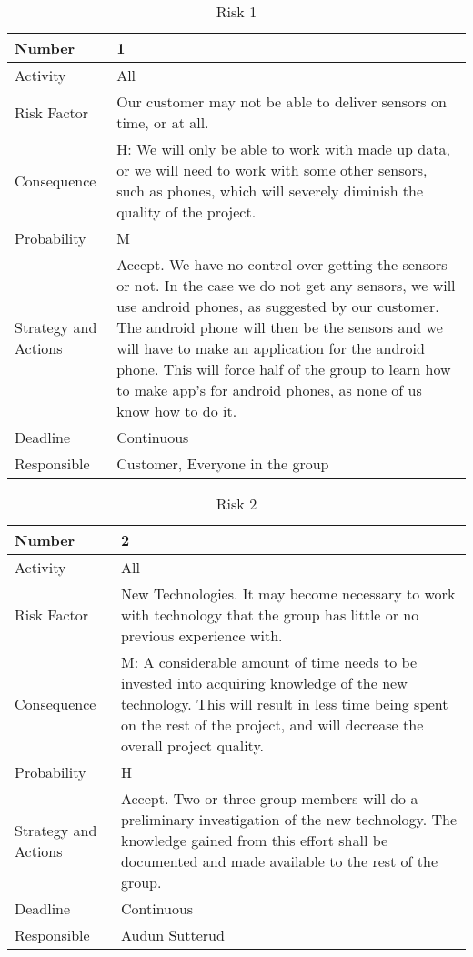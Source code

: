 \documentclass[../document.tex]{subfiles}
\begin{document}
\begin{table}[H]
\caption{Risk 1}
\begin{tabularx}{\textwidth}{|l|X|}
\hline
Number
&1
\\ \hline Activity
&All
\\ \hline Risk Factor
&Our customer may not be able to deliver sensors on time, or at all.
\\ \hline Consequence
&H: We will only be able to work with made up data, or we will need to work with some other sensors, such as phones, which will severely diminish the quality of the project.
\\ \hline Probability
&M
\\ \hline Strategy and Actions
&Accept. We have no control over getting the sensors or not. In the case we do not get any sensors, we will use android phones, as suggested by our customer. The android phone will then be the sensors and we will have to make an application for the android phone. This will force half of the group to learn how to make app’s for android phones, as none of us know how to do it.
\\ \hline Deadline
&Continuous
\\ \hline Responsible
&Customer, Everyone in the group
\\ \hline 
\end{tabularx}
\end{table}

\begin{table}[H]
\caption{Risk 2}
\begin{tabularx}{\textwidth}{|l|X|}
\hline
Number
&2
\\ \hline Activity
&All
\\ \hline Risk Factor
&New Technologies. It may become necessary to work with technology that the group has little or no previous experience with.
\\ \hline Consequence
&M: A considerable amount of time needs to be invested into acquiring knowledge of the new technology. This will result in less time being spent on the rest of the project, and will decrease the overall project quality.
\\ \hline Probability
&H
\\ \hline Strategy and Actions
&Accept. Two or three group members will do a preliminary investigation of the new technology. The knowledge gained from this effort shall be documented and made available to the rest of the group.
\\ \hline Deadline
&Continuous
\\ \hline Responsible
&Audun Sutterud
\\ \hline 
\end{tabularx}
\end{table}
\end{document}
